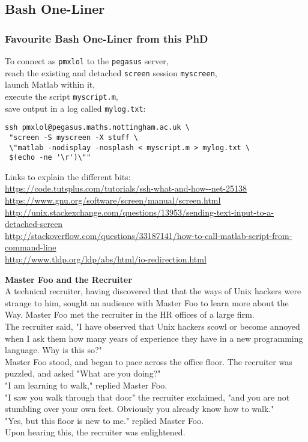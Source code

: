 \documentclass[]{beamer} %
\begin{document}
\subsection{Bash One-Liner}
\begin{frame}[fragile]\frametitle{Favourite Bash One-Liner from this PhD}
To connect as \verb+pmxlol+ to the \verb+pegasus+ server, \\
 reach the existing and detached \verb+screen+ session \verb+myscreen+,\\
 launch Matlab within it, \\
 execute the script \verb+myscript.m+, \\
 save output in a log called \verb+mylog.txt+:\\
\pause
\begin{verbatim}ssh pmxlol@pegasus.maths.nottingham.ac.uk \
 "screen -S myscreen -X stuff \
 \"matlab -nodisplay -nosplash < myscript.m > mylog.txt \
 $(echo -ne '\r')\""\end{verbatim}
 \pause
{\tiny{Links to explain the different bits:\\
\url{https://code.tutsplus.com/tutorials/ssh-what-and-how--net-25138}\\
\url{https://www.gnu.org/software/screen/manual/screen.html}\\
\url{http://unix.stackexchange.com/questions/13953/sending-text-input-to-a-detached-screen}\\
\url{http://stackoverflow.com/questions/33187141/how-to-call-matlab-script-from-command-line}\\[-2.25mm]
\url{http://www.tldp.org/ldp/abs/html/io-redirection.html}}} 
\end{frame}


\begin{frame}
\textbf{Master Foo and the Recruiter}\\[4mm]
\footnotesize{
A technical recruiter, having discovered that that the ways of Unix hackers were strange to him, 
sought an audience with Master Foo to learn more about the Way. Master Foo met the recruiter in the HR offices of a large firm.\\[2mm]
The recruiter said, "I have observed that Unix hackers scowl or become annoyed when I 
ask them how many years of experience they have in a new programming language. Why is this so?"\\[2mm]
Master Foo stood, and began to pace across the office floor. The recruiter was puzzled, and 
asked "What are you doing?"\\[2mm]
"I am learning to walk," replied Master Foo.\\[2mm]
"I saw you walk through that door" the recruiter exclaimed, "and you are not stumbling over your 
own feet. Obviously you already know how to walk."\\[2mm]
"Yes, but this floor is new to me." replied Master Foo.\\[2mm]
Upon hearing this, the recruiter was enlightened.
}
\end{frame}
\end{document}
